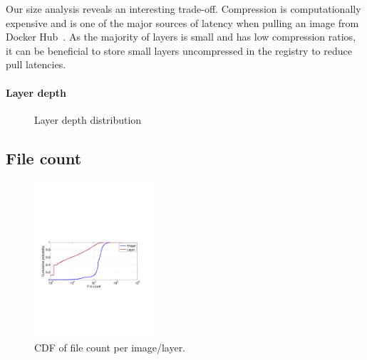 Our size analysis reveals an interesting trade-off. Compression is
computationally expensive and is one of the major sources of latency when
pulling an image from Docker Hub~\cite{slacker}.  As the majority of layers is
small and has low compression ratios, it can be beneficial to store small
layers uncompressed in the registry to reduce pull latencies.

\paragraph{Layer depth}

\begin{figure}[!t]
	\centering
	\caption{Layer depth distribution}
	\label{fig:reference-cnt}
\end{figure}

\subsection{File count} 
\begin{figure}
	\centering
	\includegraphics[width=0.4\textwidth]{graphs/file-cnt-cdf.pdf}
	\caption{CDF of file count per image/layer.
	}
	\label{fig:reference-cnt}
\end{figure}

